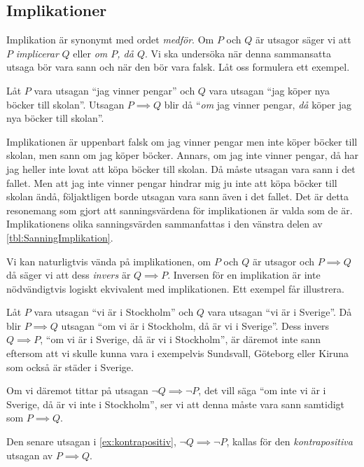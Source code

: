 \subsection{Implikationer}

Implikation är synonymt med ordet 
\emph{medför}.
Om \(P\) och \(Q\) är utsagor säger vi att \(P\) \emph{implicerar} \(Q\) eller
\emph{om \(P\), då \(Q\)}.
Vi ska undersöka när denna sammansatta utsaga bör vara sann och när den bör
vara falsk.
Låt oss formulera ett exempel.
\begin{example}
  Låt \(P\) vara utsagan \enquote{jag vinner pengar} och \(Q\) vara utsagan
  \enquote{jag köper nya böcker till skolan}.
  Utsagan \(P\implies Q\) blir då \enquote{\emph{om} jag vinner pengar,
  \emph{då} köper jag nya böcker till skolan}.
\end{example}
Implikationen är uppenbart falsk om jag vinner pengar men inte köper böcker till
skolan, men sann om jag köper böcker.
Annars, om jag inte vinner pengar, då har jag heller inte lovat att köpa
böcker till skolan.
Då måste utsagan vara sann i det fallet.
Men att jag inte vinner pengar hindrar mig ju inte att köpa böcker till
skolan ändå, följaktligen borde utsagan vara sann även i det fallet.
Det är detta resonemang som gjort att sanningsvärdena för implikationen är 
valda som de är.
Implikationens olika sanningsvärden sammanfattas i den vänstra delen av 
\cref{tbl:SanningImplikation}.

Vi kan naturligtvis vända på implikationen, om \(P\) och \(Q\) är utsagor och
\(P\implies Q\) då säger vi att dess \emph{invers} är 
\(Q\implies P\).
Inversen för en implikation är inte nödvändigtvis logiskt ekvivalent med
implikationen.
Ett exempel får illustrera.
\begin{example}\label{ex:kontrapositiv}
  Låt \(P\) vara utsagan \enquote{vi är i Stockholm} och \(Q\) vara utsagan 
  \enquote{vi är i Sverige}.
  Då blir \(P\implies Q\) utsagan \enquote{om vi är i Stockholm, då är vi i
  Sverige}.
  Dess invers \(Q\implies P\), \enquote{om vi är i Sverige, då är vi i
  Stockholm}, är däremot inte sann eftersom att vi skulle kunna vara i
  exempelvis Sundsvall, Göteborg eller Kiruna som också är städer i Sverige.

  Om vi däremot tittar på utsagan \(\lnot Q\implies \lnot P\), det vill säga
  \enquote{om inte vi är i Sverige, då är vi inte i Stockholm}, ser vi att 
  denna måste vara sann samtidigt som \(P\implies Q\).
\end{example}
Den senare utsagan i \cref{ex:kontrapositiv}, \(\lnot Q\implies \lnot P\), 
kallas för den \emph{kontrapositiva} utsagan av 
\(P\implies Q\).

